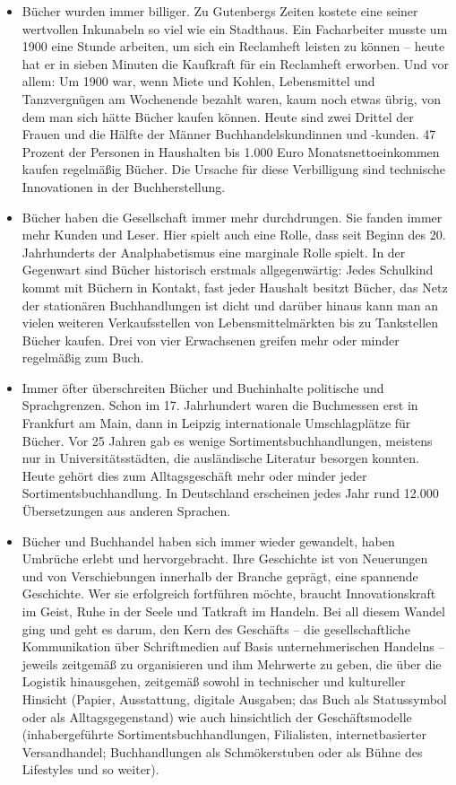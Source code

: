 \documentclass[a4paper,
fontsize=11pt,
oneside,
numbers=noperiodatend,
parskip=half-,
bibliography=totoc,
final
]{scrartcl}
\begin{document}
\begin{itemize}
\item
  Bücher wurden immer billiger. Zu Gutenbergs Zeiten kostete eine seiner
  wertvollen Inkunabeln so viel wie ein Stadthaus. Ein Facharbeiter
  musste um 1900 eine Stunde arbeiten, um sich ein Reclamheft leisten zu
  können -- heute hat er in sieben Minuten die Kaufkraft für ein
  Reclamheft erworben. Und vor allem: Um 1900 war, wenn Miete und
  Kohlen, Lebensmittel und Tanzvergnügen am Wochenende bezahlt waren,
  kaum noch etwas übrig, von dem man sich hätte Bücher kaufen können.
  Heute sind zwei Drittel der Frauen und die Hälfte der Männer
  Buchhandelskundinnen und -kunden. 47 Prozent der Personen in
  Haushalten bis 1.000 Euro Monatsnettoeinkommen kaufen regelmäßig
  Bücher. Die Ursache für diese Verbilligung sind technische
  Innovationen in der Buchherstellung.
\item
  Bücher haben die Gesellschaft immer mehr durchdrungen. Sie fanden
  immer mehr Kunden und Leser. Hier spielt auch eine Rolle, dass seit
  Beginn des 20. Jahrhunderts der Analphabetismus eine marginale Rolle
  spielt. In der Gegenwart sind Bücher historisch erstmals
  allgegenwärtig: Jedes Schulkind kommt mit Büchern in Kontakt, fast
  jeder Haushalt besitzt Bücher, das Netz der stationären Buchhandlungen
  ist dicht und darüber hinaus kann man an vielen weiteren
  Verkaufsstellen von Lebensmittelmärkten bis zu Tankstellen Bücher
  kaufen. Drei von vier Erwachsenen greifen mehr oder minder regelmäßig
  zum Buch.
\item
  Immer öfter überschreiten Bücher und Buchinhalte politische und
  Sprachgrenzen. Schon im 17. Jahrhundert waren die Buchmessen erst in
  Frankfurt am Main, dann in Leipzig internationale Umschlagplätze für
  Bücher. Vor 25 Jahren gab es wenige Sortimentsbuchhandlungen, meistens
  nur in Universitätsstädten, die ausländische Literatur besorgen
  konnten. Heute gehört dies zum Alltagsgeschäft mehr oder minder jeder
  Sortimentsbuchhandlung. In Deutschland erscheinen jedes Jahr rund
  12.000 Übersetzungen aus anderen Sprachen.
\item
  Bücher und Buchhandel haben sich immer wieder gewandelt, haben
  Umbrüche erlebt und hervorgebracht. Ihre Geschichte ist von Neuerungen
  und von Verschiebungen innerhalb der Branche geprägt, eine spannende
  Geschichte. Wer sie erfolgreich fortführen möchte, braucht
  Innovationskraft im Geist, Ruhe in der Seele und Tatkraft im Handeln.
  Bei all diesem Wandel ging und geht es darum, den Kern des Geschäfts
  -- die gesellschaftliche Kommunikation über Schriftmedien auf Basis
  unternehmerischen Handelns -- jeweils zeitgemäß zu organisieren und
  ihm Mehrwerte zu geben, die über die Logistik hinausgehen, zeitgemäß
  sowohl in technischer und kultureller Hinsicht (Papier, Ausstattung,
  digitale Ausgaben; das Buch als Statussymbol oder als
  Alltagsgegenstand) wie auch hinsichtlich der Geschäftsmodelle
  (inhabergeführte Sortimentsbuchhandlungen, Filialisten,
  internetbasierter Versandhandel; Buchhandlungen als Schmökerstuben
  oder als Bühne des Lifestyles und so weiter).
\end{itemize}
\end{document}
